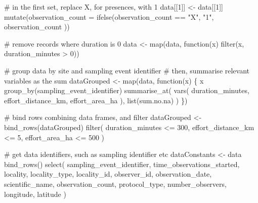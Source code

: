 \documentclass[
]{article}
\newenvironment{Shaded}{}{}
\newcommand{\CommentTok}[1]{\textcolor[rgb]{0.00,0.50,0.00}{#1}}
\newcommand{\ControlFlowTok}[1]{\textcolor[rgb]{0.00,0.00,1.00}{#1}}
\newcommand{\DataTypeTok}[1]{#1}
\newcommand{\DecValTok}[1]{#1}
\newcommand{\KeywordTok}[1]{\textcolor[rgb]{0.00,0.00,1.00}{#1}}
\newcommand{\NormalTok}[1]{#1}
\newcommand{\OperatorTok}[1]{#1}
\newcommand{\StringTok}[1]{\textcolor[rgb]{0.00,0.50,0.50}{#1}}
\begin{document}
\begin{Shaded}
\begin{Highlighting}[]
\CommentTok{# in the first set, replace X, for presences, with 1}
\NormalTok{data[[}\DecValTok{1}\NormalTok{]] <-}\StringTok{ }\NormalTok{data[[}\DecValTok{1}\NormalTok{]] }\OperatorTok{%
\StringTok{  }\KeywordTok{mutate}\NormalTok{(}\DataTypeTok{observation_count =} \KeywordTok{ifelse}\NormalTok{(observation_count }\OperatorTok{==}\StringTok{ "X"}\NormalTok{,}
    \StringTok{"1"}\NormalTok{, observation_count}
\NormalTok{  ))}

\CommentTok{# remove records where duration is 0}
\NormalTok{data <-}\StringTok{ }\KeywordTok{map}\NormalTok{(data, }\ControlFlowTok{function}\NormalTok{(x) }\KeywordTok{filter}\NormalTok{(x, duration_minutes }\OperatorTok{>}\StringTok{ }\DecValTok{0}\NormalTok{))}

\CommentTok{# group data by site and sampling event identifier}
\CommentTok{# then, summarise relevant variables as the sum}
\NormalTok{dataGrouped <-}\StringTok{ }\KeywordTok{map}\NormalTok{(data, }\ControlFlowTok{function}\NormalTok{(x) \{}
\NormalTok{  x }\OperatorTok{%
\StringTok{    }\KeywordTok{group_by}\NormalTok{(sampling_event_identifier) }\OperatorTok{%
\StringTok{    }\KeywordTok{summarise_at}\NormalTok{(}
      \KeywordTok{vars}\NormalTok{(}
\NormalTok{        duration_minutes, effort_distance_km,}
\NormalTok{        effort_area_ha}
\NormalTok{      ),}
      \KeywordTok{list}\NormalTok{(sum.no.na)}
\NormalTok{    )}
\NormalTok{\})}

\CommentTok{# bind rows combining data frames, and filter}
\NormalTok{dataGrouped <-}\StringTok{ }\KeywordTok{bind_rows}\NormalTok{(dataGrouped) }\OperatorTok{%
\StringTok{  }\KeywordTok{filter}\NormalTok{(}
\NormalTok{    duration_minutes }\OperatorTok{<=}\StringTok{ }\DecValTok{300}\NormalTok{,}
\NormalTok{    effort_distance_km }\OperatorTok{<=}\StringTok{ }\DecValTok{5}\NormalTok{,}
\NormalTok{    effort_area_ha }\OperatorTok{<=}\StringTok{ }\DecValTok{500}
\NormalTok{  )}

\CommentTok{# get data identifiers, such as sampling identifier etc}
\NormalTok{dataConstants <-}\StringTok{ }\NormalTok{data }\OperatorTok{%
\StringTok{  }\KeywordTok{bind_rows}\NormalTok{() }\OperatorTok{%
\StringTok{  }\KeywordTok{select}\NormalTok{(}
\NormalTok{    sampling_event_identifier, time_observations_started,}
\NormalTok{    locality, locality_type, locality_id,}
\NormalTok{    observer_id, observation_date, scientific_name,}
\NormalTok{    observation_count, protocol_type, number_observers,}
\NormalTok{    longitude, latitude}
\NormalTok{  )}

}}}}}}
\end{Highlighting}
\end{Shaded}
\end{document}
